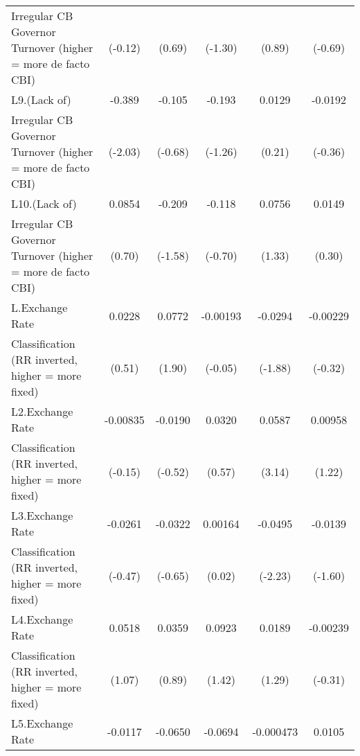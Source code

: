 {\begin{tabular}{l*{5}{c}}
Irregular CB Governor Turnover (higher = more de facto CBI)&     (-0.12)         &      (0.69)         &     (-1.30)         &      (0.89)         &     (-0.69)         \\
[1em]
L9.(Lack of)        &      -0.389\sym{*}  &      -0.105         &      -0.193         &      0.0129         &     -0.0192         \\
Irregular CB Governor Turnover (higher = more de facto CBI)&     (-2.03)         &     (-0.68)         &     (-1.26)         &      (0.21)         &     (-0.36)         \\
[1em]
L10.(Lack of)       &      0.0854         &      -0.209         &      -0.118         &      0.0756         &      0.0149         \\
Irregular CB Governor Turnover (higher = more de facto CBI)&      (0.70)         &     (-1.58)         &     (-0.70)         &      (1.33)         &      (0.30)         \\
[1em]
L.Exchange Rate     &      0.0228         &      0.0772         &    -0.00193         &     -0.0294         &    -0.00229         \\
Classification (RR inverted, higher = more fixed)&      (0.51)         &      (1.90)         &     (-0.05)         &     (-1.88)         &     (-0.32)         \\
[1em]
L2.Exchange Rate    &    -0.00835         &     -0.0190         &      0.0320         &      0.0587\sym{**} &     0.00958         \\
Classification (RR inverted, higher = more fixed)&     (-0.15)         &     (-0.52)         &      (0.57)         &      (3.14)         &      (1.22)         \\
[1em]
L3.Exchange Rate    &     -0.0261         &     -0.0322         &     0.00164         &     -0.0495\sym{*}  &     -0.0139         \\
Classification (RR inverted, higher = more fixed)&     (-0.47)         &     (-0.65)         &      (0.02)         &     (-2.23)         &     (-1.60)         \\
[1em]
L4.Exchange Rate    &      0.0518         &      0.0359         &      0.0923         &      0.0189         &    -0.00239         \\
Classification (RR inverted, higher = more fixed)&      (1.07)         &      (0.89)         &      (1.42)         &      (1.29)         &     (-0.31)         \\
[1em]
L5.Exchange Rate    &     -0.0117         &     -0.0650         &     -0.0694         &   -0.000473         &      0.0105         \\

\end{tabular}}
